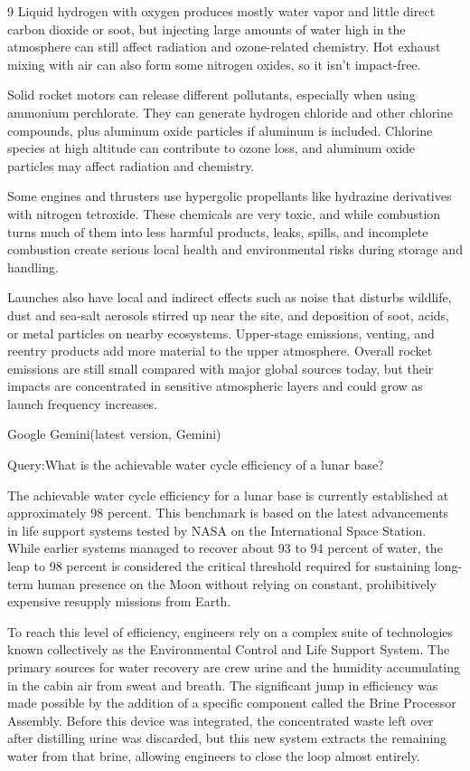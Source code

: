 \documentclass{mcmthesis}
\begin{document}
\begin{ReportAiUse}{9}
Liquid hydrogen with oxygen produces mostly water vapor and little direct carbon dioxide or soot, but injecting large amounts of water high in the atmosphere can still affect radiation and ozone-related chemistry. Hot exhaust mixing with air can also form some nitrogen oxides, so it isn’t impact-free.

Solid rocket motors can release different pollutants, especially when using ammonium perchlorate. They can generate hydrogen chloride and other chlorine compounds, plus aluminum oxide particles if aluminum is included. Chlorine species at high altitude can contribute to ozone loss, and aluminum oxide particles may affect radiation and chemistry.

Some engines and thrusters use hypergolic propellants like hydrazine derivatives with nitrogen tetroxide. These chemicals are very toxic, and while combustion turns much of them into less harmful products, leaks, spills, and incomplete combustion create serious local health and environmental risks during storage and handling.

Launches also have local and indirect effects such as noise that disturbs wildlife, dust and sea-salt aerosols stirred up near the site, and deposition of soot, acids, or metal particles on nearby ecosystems. Upper-stage emissions, venting, and reentry products add more material to the upper atmosphere. Overall rocket emissions are still small compared with major global sources today, but their impacts are concentrated in sensitive atmospheric layers and could grow as launch frequency increases.

Google Gemini(latest version, Gemini)

Query:What is the achievable water cycle efficiency of a lunar base?

The achievable water cycle efficiency for a lunar base is currently established at approximately 98 percent. This benchmark is based on the latest advancements in life support systems tested by NASA on the International Space Station. While earlier systems managed to recover about 93 to 94 percent of water, the leap to 98 percent is considered the critical threshold required for sustaining long-term human presence on the Moon without relying on constant, prohibitively expensive resupply missions from Earth.

To reach this level of efficiency, engineers rely on a complex suite of technologies known collectively as the Environmental Control and Life Support System. The primary sources for water recovery are crew urine and the humidity accumulating in the cabin air from sweat and breath. The significant jump in efficiency was made possible by the addition of a specific component called the Brine Processor Assembly. Before this device was integrated, the concentrated waste left over after distilling urine was discarded, but this new system extracts the remaining water from that brine, allowing engineers to close the loop almost entirely.


\end{ReportAiUse}
\end{document}
